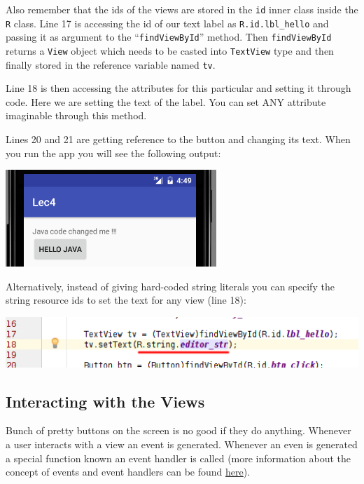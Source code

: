 Also remember that the ids of the views are stored in the \texttt{id} inner class inside the \texttt{R} class. Line 17 is accessing the id of our text label as \texttt{R.id.lbl\_hello} and passing it as argument to the ``\texttt{findViewById}'' method. Then \texttt{findViewById} returns a \texttt{View} object which needs to be casted into \texttt{TextView} type and then finally stored in the reference variable named \texttt{tv}.

Line 18 is then accessing the attributes for this particular and setting it through code. Here we are setting the text of the label. You can set ANY attribute imaginable through this method.

Lines 20 and 21 are getting reference to the button and changing its text. When you run the app you will see the following output:

\begin{center}
	\includegraphics[scale=0.4]{chapters/ch04/images/46}
\end{center}

Alternatively, instead of giving hard-coded string literals you can specify the string resource ids to set the text for any view (line 18):

\begin{center}
	\includegraphics[scale=0.4]{chapters/ch04/images/47}
\end{center}

\subsection{Interacting with the Views}
Bunch of pretty buttons on the screen is no good if they do anything. Whenever a user interacts with a view an event is generated. Whenever an even is generated a special function known an event handler is called (more information about the concept of events and event handlers can be found \href{https://en.wikipedia.org/wiki/Event_(computing)}{here}). 

